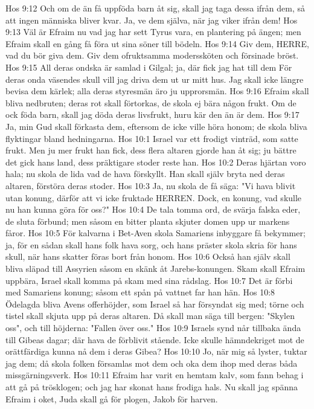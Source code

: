 Hos 9:12  Och om de än få uppföda barn åt sig, skall jag taga dessa ifrån dem, så att ingen människa bliver kvar. Ja, ve dem själva, när jag viker ifrån dem!
Hos 9:13  Väl är Efraim nu vad jag har sett Tyrus vara, en plantering på ängen; men Efraim skall en gång få föra ut sina söner till bödeln.
Hos 9:14  Giv dem, HERRE, vad du bör giva dem. Giv dem ofruktsamma moderssköten och försinade bröst.
Hos 9:15  All deras ondska är samlad i Gilgal; ja, där fick jag hat till dem För deras onda väsendes skull vill jag driva dem ut ur mitt hus. Jag skall icke längre bevisa dem kärlek; alla deras styresmän äro ju upprorsmän.
Hos 9:16  Efraim skall bliva nedbruten; deras rot skall förtorkas, de skola ej bära någon frukt. Om de ock föda barn, skall jag döda deras livsfrukt, huru kär den än är dem.
Hos 9:17  Ja, min Gud skall förkasta dem, eftersom de icke ville höra honom; de skola bliva flyktingar bland hedningarna.
Hos 10:1  Israel var ett frodigt vinträd, som satte frukt. Men ju mer frukt han fick, dess flera altaren gjorde han åt sig; ju bättre det gick hans land, dess präktigare stoder reste han.
Hos 10:2  Deras hjärtan voro hala; nu skola de lida vad de hava förskyllt. Han skall själv bryta ned deras altaren, förstöra deras stoder.
Hos 10:3  Ja, nu skola de få säga: "Vi hava blivit utan konung, därför att vi icke fruktade HERREN. Dock, en konung, vad skulle nu han kunna göra för oss?"
Hos 10:4  De tala tomma ord, de svärja falska eder, de sluta förbund; men såsom en bitter planta skjuter domen upp ur markens fåror.
Hos 10:5  För kalvarna i Bet-Aven skola Samariens inbyggare få bekymmer; ja, för en sådan skall hans folk hava sorg, och hans präster skola skria för hans skull, när hans skatter föras bort från honom.
Hos 10:6  Också han själv skall bliva släpad till Assyrien såsom en skänk åt Jarebs-konungen. Skam skall Efraim uppbära, Israel skall komma på skam med sina rådslag.
Hos 10:7  Det är förbi med Samariens konung; såsom ett spån på vattnet far han hän.
Hos 10:8  Ödelagda bliva Avens offerhöjder, som Israel så har försyndat sig med; törne och tistel skall skjuta upp på deras altaren. Då skall man säga till bergen: "Skylen oss", och till höjderna: "Fallen över oss."
Hos 10:9  Israels synd når tillbaka ända till Gibeas dagar; där hava de förblivit stående. Icke skulle hämndekriget mot de orättfärdiga kunna nå dem i deras Gibea?
Hos 10:10  Jo, när mig så lyster, tuktar jag dem; då skola folken församlas mot dem och oka dem ihop med deras båda missgärningsverk.
Hos 10:11  Efraim har varit en hemtam kalv, som fann behag i att gå på trösklogen; och jag har skonat hans frodiga hals. Nu skall jag spänna Efraim i oket, Juda skall gå för plogen, Jakob för harven.
